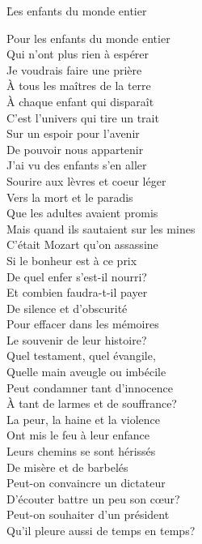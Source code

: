 \documentclass{novel}
\begin{document}
\h*{Les enfants du monde entier}
\begin{multicols}{2}
Pour les enfants du monde entier \\
Qui n'ont plus rien à espérer \\
Je voudrais faire une prière \\
À tous les maîtres de la terre \\

À chaque enfant qui disparaît \\
C'est l'univers qui tire un trait \\
Sur un espoir pour l'avenir \\
De pouvoir nous appartenir \\

J'ai vu des enfants s'en aller \\
Sourire aux lèvres et coeur léger \\
Vers la mort et le paradis \\
Que les adultes avaient promis \\

Mais quand ils sautaient sur les mines \\
C'était Mozart qu'on assassine \\
Si le bonheur est à ce prix \\
De quel enfer s'est-il nourri? \\

Et combien faudra-t-il payer \\
De silence et d'obscurité \\
Pour effacer dans les mémoires \\
Le souvenir de leur histoire? \\

Quel testament, quel évangile, \\
Quelle main aveugle ou imbécile \\
Peut condamner tant d'innocence \\
À tant de larmes et de souffrance? \\

La peur, la haine et la violence \\
Ont mis le feu à leur enfance \\
Leurs chemins se sont hérissés \\
De misère et de barbelés \\

Peut-on convaincre un dictateur \\
D'écouter battre un peu son cœur? \\
Peut-on souhaiter d'un président \\
Qu'il pleure aussi de temps en temps? \\


\end{multicols}
\end{document}
